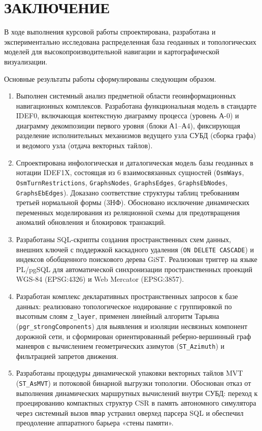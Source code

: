 \chapter*{ЗАКЛЮЧЕНИЕ}

В ходе выполнения курсовой работы спроектирована, разработана и экспериментально исследована распределенная база геоданных и топологических моделей для высокопроизводительной навигации и картографической визуализации.

Основные результаты работы сформулированы следующим образом.
\begin{enumerate}
    \item Выполнен системный анализ предметной области геоинформационных навигационных комплексов. Разработана функциональная модель в стандарте IDEF0, включающая контекстную диаграмму процесса (уровень А-0) и диаграмму декомпозиции первого уровня (блоки А1--А4), фиксирующая разделение исполнительных механизмов ведущего узла СУБД (сборка графа) и ведомого узла (отдача векторных тайлов).
    \item Спроектирована инфологическая и даталогическая модель базы геоданных в нотации IDEF1X, состоящая из 6 взаимосвязанных сущностей (\texttt{OsmWays}, \texttt{OsmTurnRestrictions}, \texttt{GraphsNodes}, \texttt{GraphsEdges}, \texttt{GraphsEbNodes}, \texttt{GraphsEbEdges}). Доказано соответствие структуры таблиц требованиям третьей нормальной формы (3НФ). Обосновано исключение динамических переменных моделирования из реляционной схемы для предотвращения аномалий обновления и блокировок транзакций.
    \item Разработаны SQL-скрипты создания пространственных схем данных, внешних ключей с поддержкой каскадного удаления (\texttt{ON DELETE CASCADE}) и индексов обобщенного поискового дерева GiST. Реализован триггер на языке PL/pgSQL для автоматической синхронизации пространственных проекций WGS-84 (EPSG:4326) и Web Mercator (EPSG:3857).
    \item Разработан комплекс декларативных пространственных запросов к базе данных: реализовано топологическое нодирование с группировкой по высотным слоям \texttt{z\_layer}, применен линейный алгоритм Тарьяна (\texttt{pgr\_strongComponents}) для выявления и изоляции несвязных компонент дорожной сети, и сформирован ориентированный реберно-вершинный граф маневров с вычислением геометрических азимутов (\texttt{ST\_Azimuth}) и фильтрацией запретов движения.
    \item Разработаны процедуры динамической упаковки векторных тайлов MVT (\texttt{ST\_AsMVT}) и потоковой бинарной выгрузки топологии. Обоснован отказ от выполнения динамических маршрутных вычислений внутри СУБД: переход к проецированию компактных структур CSR в память автономного симулятора через системный вызов \texttt{mmap} устранил оверхед парсера SQL и обеспечил преодоление аппаратного барьера «стены памяти».

\end{enumerate}
